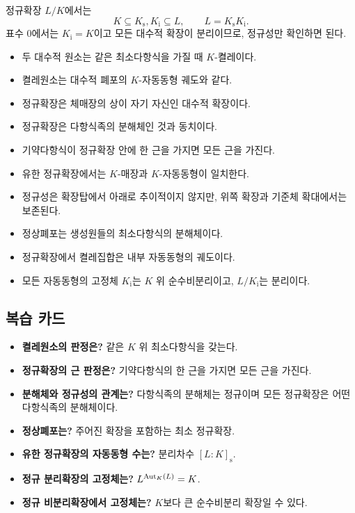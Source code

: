 정규확장 $L/K$에서는
\[
  K\subseteq K_{\mathrm s},K_{\mathrm i}\subseteq L,
  \qquad
  L=K_{\mathrm s}K_{\mathrm i}.
\]
표수 $0$에서는 $K_{\mathrm i}=K$이고 모든 대수적 확장이 분리이므로, 정규성만 확인하면 된다.

\begin{chapterreview}
\begin{itemize}
  \item 두 대수적 원소는 같은 최소다항식을 가질 때 $K$-켤레이다.
  \item 켤레원소는 대수적 폐포의 $K$-자동동형 궤도와 같다.
  \item 정규확장은 체매장의 상이 자기 자신인 대수적 확장이다.
  \item 정규확장은 다항식족의 분해체인 것과 동치이다.
  \item 기약다항식이 정규확장 안에 한 근을 가지면 모든 근을 가진다.
  \item 유한 정규확장에서는 $K$-매장과 $K$-자동동형이 일치한다.
  \item 정규성은 확장탑에서 아래로 추이적이지 않지만, 위쪽 확장과 기준체 확대에서는 보존된다.
  \item 정상폐포는 생성원들의 최소다항식의 분해체이다.
  \item 정규확장에서 켤레집합은 내부 자동동형의 궤도이다.
  \item 모든 자동동형의 고정체 $K_{\mathrm i}$는 $K$ 위 순수비분리이고, $L/K_{\mathrm i}$는 분리이다.
\end{itemize}
\end{chapterreview}

\subsection*{복습 카드}

\begin{itemize}
  \item \textbf{켤레원소의 판정은?} 같은 $K$ 위 최소다항식을 갖는다.
  \item \textbf{정규확장의 근 판정은?} 기약다항식의 한 근을 가지면 모든 근을 가진다.
  \item \textbf{분해체와 정규성의 관계는?} 다항식족의 분해체는 정규이며 모든 정규확장은 어떤 다항식족의 분해체이다.
  \item \textbf{정상폐포는?} 주어진 확장을 포함하는 최소 정규확장.
  \item \textbf{유한 정규확장의 자동동형 수는?} 분리차수 $[L:K]_{\mathrm s}$.
  \item \textbf{정규 분리확장의 고정체는?} $L^{\operatorname{Aut}_K(L)}=K$.
  \item \textbf{정규 비분리확장에서 고정체는?} $K$보다 큰 순수비분리 확장일 수 있다.
\end{itemize}
